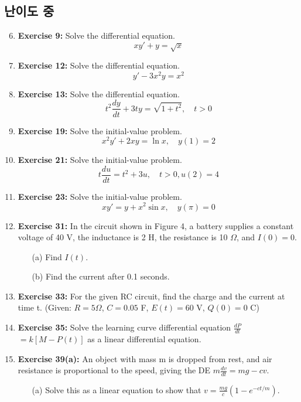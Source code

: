 \documentclass[12pt, a4paper]{article}
\begin{document}
\subsection*{난이도 중 }
\begin{enumerate}
    \setcounter{enumi}{5} %
    \item \textbf{Exercise 9:} Solve the differential equation.
    \[ xy' + y = \sqrt{x} \]

    \item \textbf{Exercise 12:} Solve the differential equation.
    \[ y' - 3x^2y = x^2 \]

    \item \textbf{Exercise 13:} Solve the differential equation.
    \[ t^2\frac{dy}{dt} + 3ty = \sqrt{1+t^2}, \quad t>0 \]

    \item \textbf{Exercise 19:} Solve the initial-value problem.
    \[ x^2y' + 2xy = \ln x, \quad y(1)=2 \]

    \item \textbf{Exercise 21:} Solve the initial-value problem.
    \[ t\frac{du}{dt} = t^2 + 3u, \quad t>0, u(2)=4 \]

    \item \textbf{Exercise 23:} Solve the initial-value problem.
    \[ xy' = y + x^2\sin x, \quad y(\pi)=0 \]

    \item \textbf{Exercise 31:} In the circuit shown in Figure 4, a battery supplies a constant voltage of 40 V, the inductance is 2 H, the resistance is 10 $\Omega$, and $I(0)=0$.
    \begin{itemize}
        \item[(a)] Find $I(t)$.
        \item[(b)] Find the current after 0.1 seconds.
    \end{itemize}

    \item \textbf{Exercise 33:} For the given RC circuit, find the charge and the current at time t. (Given: $R=5\Omega$, $C=0.05$ F, $E(t)=60$ V, $Q(0)=0$ C)

    \item \textbf{Exercise 35:} Solve the learning curve differential equation {\large$\frac{dP}{dt}$}$=k[M-P(t)]$ as a linear differential equation.

    \item \textbf{Exercise 39(a):} An object with mass m is dropped from rest, and air resistance is proportional to the speed, giving the DE $m\frac{dv}{dt}=mg-cv$.
    \begin{itemize}
        \item[(a)] Solve this as a linear equation to show that $v=\frac{mg}{c}(1-e^{-ct/m})$.
    \end{itemize}
\end{enumerate}
\end{document}
